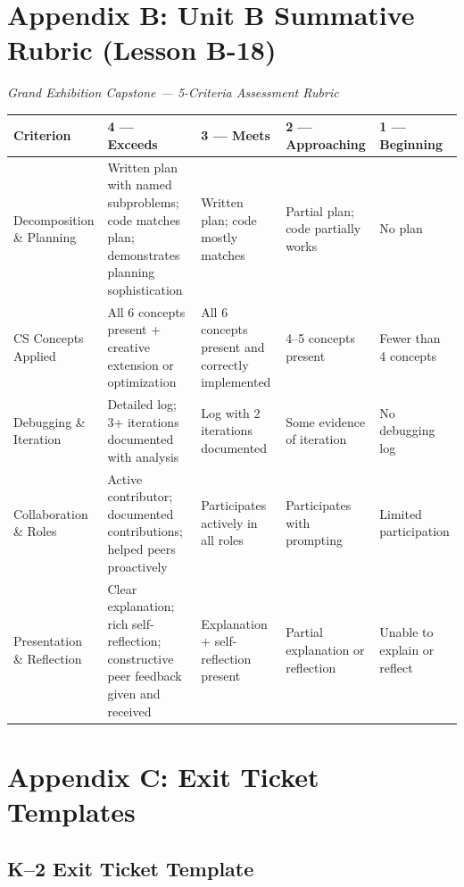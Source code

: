 \documentclass[11pt,letterpaper]{article}
\begin{document}
\newpage
\section{Appendix B: Unit B Summative Rubric (Lesson B-18)}
\label{sec:AppendixBUnitBSummativeRubricLessonB18}

\textit{Grand Exhibition Capstone --- 5-Criteria Assessment Rubric}

\begin{longtable}{|L{0.18\textwidth}|L{0.18\textwidth}|L{0.18\textwidth}|L{0.18\textwidth}|L{0.18\textwidth}|}
\hline
\textbf{Criterion}  & \textbf{4 --- Exceeds}  & \textbf{3 --- Meets}  & \textbf{2 --- Approaching}  & \textbf{1 --- Beginning}  \\
\hline
Decomposition \& Planning  & Written plan with named subproblems; code matches plan; demonstrates planning sophistication  & Written plan; code mostly matches  & Partial plan; code partially works  & No plan  \\
\hline
CS Concepts Applied  & All 6 concepts present + creative extension or optimization  & All 6 concepts present and correctly implemented  & 4--5 concepts present  & Fewer than 4 concepts  \\
\hline
Debugging \& Iteration  & Detailed log; 3+ iterations documented with analysis  & Log with 2 iterations documented  & Some evidence of iteration  & No debugging log  \\
\hline
Collaboration \& Roles  & Active contributor; documented contributions; helped peers proactively  & Participates actively in all roles  & Participates with prompting  & Limited participation  \\
\hline
Presentation \& Reflection  & Clear explanation; rich self-reflection; constructive peer feedback given and received  & Explanation + self-reflection present  & Partial explanation or reflection  & Unable to explain or reflect  \\
\hline
\end{longtable}

\newpage
\section{Appendix C: Exit Ticket Templates}
\label{sec:AppendixCExitTicketTemplates}

\subsection{K--2 Exit Ticket Template}
\label{sub:K2ExitTicketTemplate}
\end{document}
